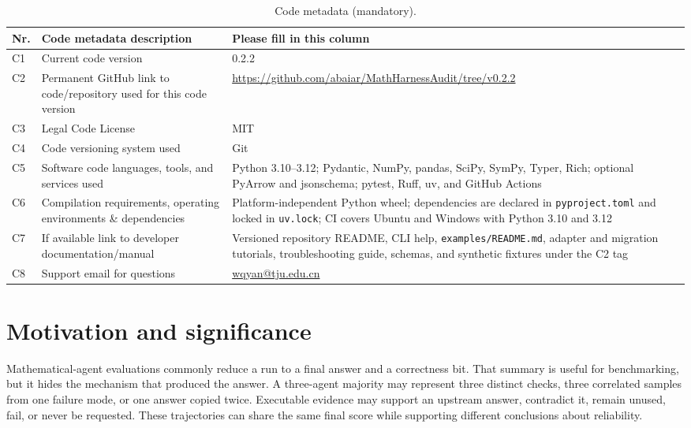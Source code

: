 \documentclass[preprint,12pt,a4paper]{elsarticle}
\begin{document}
\begin{table}[H]
\centering
\small
\begin{tabularx}{\textwidth}{|l|L{4.8cm}|Y|}
\hline
\textbf{Nr.} & \textbf{Code metadata description} &
\textbf{Please fill in this column} \\
\hline
C1 & Current code version & 0.2.2 \\
\hline
C2 & Permanent GitHub link to code/repository used for this code version &
\url{https://github.com/abaiar/MathHarnessAudit/tree/v0.2.2} \\
\hline
C3 & Legal Code License & MIT \\
\hline
C4 & Code versioning system used & Git \\
\hline
C5 & Software code languages, tools, and services used & Python 3.10--3.12;
Pydantic, NumPy, pandas, SciPy, SymPy, Typer, Rich; optional PyArrow and
jsonschema; pytest, Ruff, uv, and GitHub Actions \\
\hline
C6 & Compilation requirements, operating environments \& dependencies &
Platform-independent Python wheel; dependencies are declared in
\texttt{pyproject.toml} and locked in \texttt{uv.lock}; CI covers
Ubuntu and Windows with Python 3.10 and 3.12 \\
\hline
C7 & If available link to developer documentation/manual & Versioned repository README,
CLI help, \texttt{examples/README.md}, adapter and migration tutorials,
troubleshooting guide, schemas, and synthetic fixtures under the C2 tag \\
\hline
C8 & Support email for questions & \url{wqyan@tju.edu.cn} \\
\hline
\end{tabularx}
\caption{Code metadata (mandatory).}
\label{tab:code-metadata}
\end{table}

\section{Motivation and significance}
\label{sec:motivation}

Mathematical-agent evaluations commonly reduce a run to a final answer and a
correctness bit. That summary is useful for benchmarking, but it hides the
mechanism that produced the answer. A three-agent majority may represent three
distinct checks, three correlated samples from one failure mode, or one answer
copied twice. Executable evidence may support an upstream answer, contradict
it, remain unused, fail, or never be requested. These trajectories can share
the same final score while supporting different conclusions about reliability.
\end{document}
